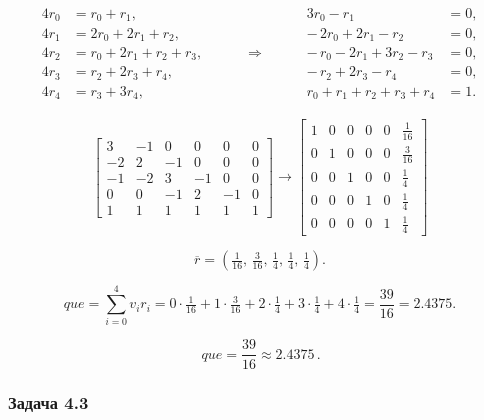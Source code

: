 \[
	\begin{array}{rcl}
		\begin{aligned}
			4r_0 & = r_0 + r_1,              \\
			4r_1 & = 2r_0 + 2r_1 + r_2,      \\
			4r_2 & = r_0 + 2r_1 + r_2 + r_3, \\
			4r_3 & = r_2 + 2r_3 + r_4,       \\
			4r_4 & = r_3 + 3r_4,
		\end{aligned}
		 & \qquad \Rightarrow \qquad &
		\begin{aligned}
			3r_0 - r_1                 & = 0, \\
			-\,2r_0 + 2r_1 - r_2       & = 0, \\
			-\,r_0 - 2r_1 + 3r_2 - r_3 & = 0, \\
			-\,r_2 + 2r_3 - r_4        & = 0, \\
			r_0+r_1+r_2+r_3+r_4        & = 1.
		\end{aligned}
	\end{array}
\]

\[
	\left[
		\begin{array}{rrrrr|r}
			3  & -1 & 0  & 0  & 0  & 0 \\
			-2 & 2  & -1 & 0  & 0  & 0 \\
			-1 & -2 & 3  & -1 & 0  & 0 \\
			0  & 0  & -1 & 2  & -1 & 0 \\
			1  & 1  & 1  & 1  & 1  & 1
		\end{array}
		\right]
	\longrightarrow
	\left[
		\begin{array}{rrrrr|r}
			1 & 0 & 0 & 0 & 0 & \tfrac{1}{16} \\
			0 & 1 & 0 & 0 & 0 & \tfrac{3}{16} \\
			0 & 0 & 1 & 0 & 0 & \tfrac{1}{4}  \\
			0 & 0 & 0 & 1 & 0 & \tfrac{1}{4}  \\
			0 & 0 & 0 & 0 & 1 & \tfrac{1}{4}
		\end{array}
		\right]
\]

\[
	\overline r=\left(\tfrac{1}{16},\,\tfrac{3}{16},\,\tfrac{1}{4},\,\tfrac{1}{4},\,\tfrac{1}{4}\right).
\]

\[
	que=\sum_{i=0}^{4} v_i r_i
	= 0\cdot\tfrac{1}{16}+1\cdot\tfrac{3}{16}+2\cdot\tfrac{1}{4}+3\cdot\tfrac{1}{4}+4\cdot\tfrac{1}{4}
	= \frac{39}{16}=2.4375.
\]

\[
	\boxed{\,que=\frac{39}{16}\approx 2.4375\, }.
\]

\subsubsection*{Задача 4.3}

